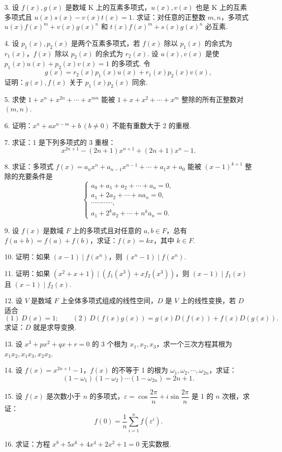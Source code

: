 \documentclass[UTF8, 12pt, fontset=fandol, oneside]{ctexart}
\begin{document}
3. 设 $f(x),g(x)$ 是数域 K 上的互素多项式，$u(x),v(x)$ 也是 K 上的互素多项式且 $u(x)s(x)-v(x)t(x)=1$. 求证：对任意的正整数 $m,n$，多项式 $u(x)f(x)^m+v(x)g(x)^n$ 和 $t(x)f(x)^m+s(x)g(x)^n$ 必互素.

4. 设 $p_1(x),p_2(x)$ 是两个互素多项式，若 $f(x)$ 除以 $p_1(x)$ 的余式为 $r_1(x)$，$f(x)$ 除以 $p_2(x)$ 的余式为 $r_2(x)$. 设 $u(x),v(x)$ 是使 $p_1(x)u(x)+p_2(x)v(x)=1$ 的多项式. 令
\[
g(x)=r_2(x)p_1(x)u(x)+r_1(x)p_2(x)v(x),
\]
证明：$g(x),f(x)$ 关于 $p_1(x)p_2(x)$ 同余.

5. 求使 $1+x^n+x^{2n}+\cdots+x^{mn}$ 能被 $1+x+x^2+\cdots+x^m$ 整除的所有正整数对 $(m,n)$.

6. 证明：$x^n+ax^{n-m}+b\ (b\ne0)$ 不能有重数大于 2 的重根.

7. 求证：1 是下列多项式的 3 重根：
\[
x^{2n+1}-(2n+1)x^{n+1}+(2n+1)x^n-1.
\]

8. 求证：多项式 $f(x)=a_nx^n+a_{n-1}x^{n-1}+\cdots+a_1x+a_0$ 能被 $(x-1)^{k+1}$ 整除的充要条件是
\[
\begin{cases}
a_0+a_1+a_2+\cdots+a_n=0,\\
a_1+2a_2+\cdots+na_n=0,\\
\cdots\cdots\cdots\cdots,\\
a_1+2^ka_2+\cdots+n^ka_n=0.
\end{cases}
\]

9. 设 $f(x)$ 是数域 $F$ 上的多项式且对任意的 $a,b\in F$，总有 $f(a+b)=f(a)+f(b)$，求证：$f(x)=kx$，其中 $k\in F$.

10. 证明：如果 $(x-1)\mid f(x^n)$，则 $(x^n-1)\mid f(x^n)$.

11. 证明：如果 $(x^2+x+1)\mid(f_1(x^3)+xf_2(x^3))$，则 $(x-1)\mid f_1(x)$ 且 $(x-1)\mid f_2(x)$.

12. 设 $V$ 是数域 $F$ 上全体多项式组成的线性空间，$D$ 是 $V$ 上的线性变换，若 $D$ 适合
\[
(1)\ D(x)=1;\qquad (2)\ D(f(x)g(x))=g(x)D(f(x))+f(x)D(g(x)).
\]
求证：$D$ 就是求导变换.

13. 设 $x^3+px^2+qx+r=0$ 的 3 个根为 $x_1,x_2,x_3$，求一个三次方程其根为 $x_1x_2,x_1x_3,x_2x_3$.

14. 设 $f(x)=x^{2n+1}-1$，$f(x)$ 的不等于 1 的根为 $\omega_1,\omega_2,\cdots,\omega_{2n}$，求证：
\[
(1-\omega_1)(1-\omega_2)\cdots(1-\omega_{2n})=2n+1.
\]

15. 设 $f(x)$ 是次数小于 $n$ 的多项式，$\varepsilon=\cos\dfrac{2\pi}{n}+i\sin\dfrac{2\pi}{n}$ 是 1 的 $n$ 次根，求证：
\[
f(0)=\frac{1}{n}\sum_{i=1}^n f(\varepsilon^i).
\]

16. 求证：方程 $x^8+5x^6+4x^4+2x^2+1=0$ 无实数根.
\end{document}

